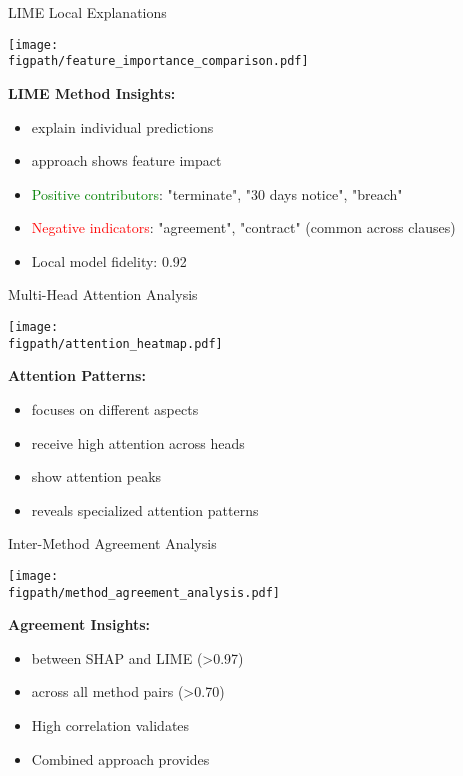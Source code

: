 \begin{frame}{LIME Local Explanations}
\begin{center}
\texttt{[image: \\figpath/feature\_importance\_comparison.pdf]}
\end{center}

\textbf{LIME Method Insights:}
\begin{itemize}
    \item {} explain individual predictions
    \item {} approach shows feature impact
    \item \textcolor{green}{Positive contributors}: "terminate", "30 days notice", "breach"
    \item \textcolor{red}{Negative indicators}: "agreement", "contract" (common across clauses)
    \item Local model fidelity: 0.92
\end{itemize}
\end{frame}

\begin{frame}{Multi-Head Attention Analysis}
\begin{center}
\texttt{[image: \\figpath/attention\_heatmap.pdf]}
\end{center}

\textbf{Attention Patterns:}
\begin{itemize}
    \item {} focuses on different aspects
    \item {} receive high attention across heads
    \item {} show attention peaks
    \item {} reveals specialized attention patterns
\end{itemize}
\end{frame}

\begin{frame}{Inter-Method Agreement Analysis}
\begin{center}
\texttt{[image: \\figpath/method\_agreement\_analysis.pdf]}
\end{center}

\textbf{Agreement Insights:}
\begin{itemize}
    \item {} between SHAP and LIME (>0.97)
    \item {} across all method pairs (>0.70)
    \item High correlation validates 
    \item Combined approach provides 
\end{itemize}
\end{frame}

